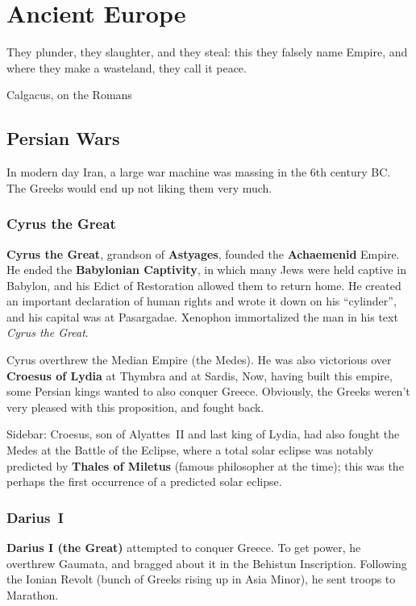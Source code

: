 \chapter{Ancient Europe}

\epigraph{%
  They plunder, they slaughter, and they steal:
  this they falsely name Empire, and where they make a wasteland, they call it peace.
}{Calgacus, on the Romans}

\section{Persian Wars}

In modern day Iran, a large war machine was massing in the 6th century BC\@.
The Greeks would end up not liking them very much.

\subsection*{Cyrus the Great}

\textbf{Cyrus the Great}, grandson of \textbf{Astyages}, founded the \textbf{Achaemenid} Empire.
He ended the \textbf{Babylonian Captivity}, in which many Jews were held captive in Babylon,
and his Edict of Restoration allowed them to return home.
He created an important declaration of human rights and wrote it down on his ``cylinder'',
and his capital was at Pasargadae.
Xenophon immortalized the man in his text \textit{Cyrus the Great}.

Cyrus overthrew the Median Empire (the Medes).
He was also victorious over \textbf{Croesus of Lydia} at Thymbra and at Sardis,
Now, having built this empire, some Persian kings wanted to also conquer Greece.
Obviously, the Greeks weren't very pleased with this proposition, and fought back.

Sidebar:
Croesus, son of Alyattes~II and last king of Lydia,
had also fought the Medes at the Battle of the Eclipse,
where a total solar eclipse was notably predicted by \textbf{Thales of Miletus}
(famous philosopher at the time);
this was the perhaps the first occurrence of a predicted solar eclipse.

\subsection*{Darius~I}

\textbf{Darius I (the Great)} attempted to conquer Greece.
To get power, he overthrew Gaumata, and bragged about it in the Behistun Inscription.
Following the Ionian Revolt (bunch of Greeks rising up in Asia Minor), he sent troops to Marathon.

